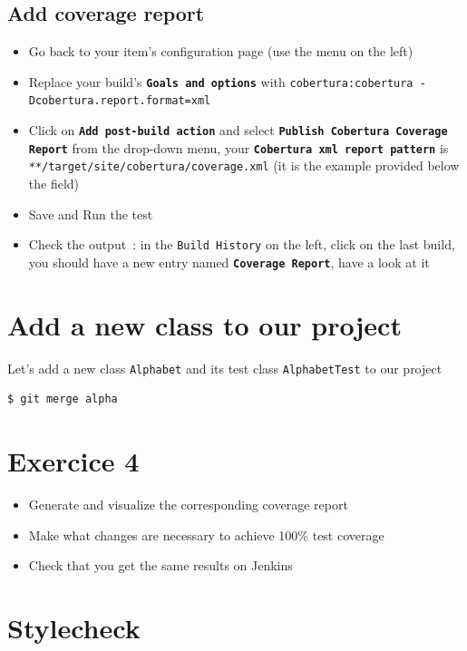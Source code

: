 \documentclass{article}
\begin{document}
\subsection{Add coverage report}
\begin{itemize}
\item Go back to your item's configuration page (use the menu on the left)
\item Replace your build's \textbf{\texttt{Goals and options}} with \texttt{cobertura:cobertura -Dcobertura.report.format=xml}
\item Click on \textbf{\texttt{Add post-build action}} and select \textbf{\texttt{Publish Cobertura Coverage Report}} from the drop-down menu, your \textbf{\texttt{Cobertura xml report pattern}} is \texttt{**/target/site/cobertura/coverage.xml} (it is the example provided below the field)
\item Save and Run the test
\item Check the output~: in the \texttt{Build History} on the left, click on the last build, you should have a new entry named \textbf{\texttt{Coverage Report}}, have a look at it
\end{itemize}



\section{Add a new class to our project}

Let's add a new class \texttt{Alphabet} and its test class \texttt{AlphabetTest} to our project
\begin{lstlisting}
$ git merge alpha
\end{lstlisting}


\section{Exercice 4}
\begin{itemize}
\item Generate and visualize the corresponding coverage report
\item Make what changes are necessary to achieve 100\% test coverage
\item Check that you get the same results on Jenkins
\end{itemize}

\section{Stylecheck}
\end{document}
